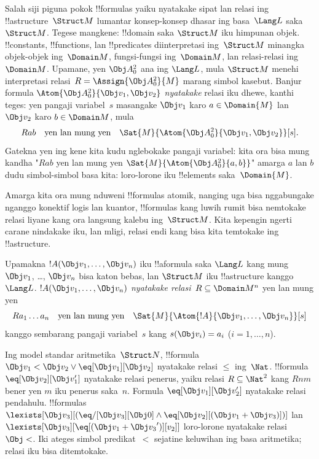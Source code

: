 \documentclass[../../../include/open-logic-section]{subfiles}
\begin{document}


\begin{explain}
Salah siji piguna pokok !!{formula}s yaiku nyatakake sipat
lan relasi ing !!a{structure}~$\Struct M$ lumantar konsep-konsep
dhasar ing basa~$\Lang L$ saka~$\Struct M$. Tegese mangkene:
!!{domain} saka $\Struct M$ iku himpunan objek.
!!{constant}s, !!{function}s, lan !!{predicate}s
diinterpretasi ing~$\Struct M$ minangka objek-objek
ing~$\Domain M$, fungsi-fungsi ing~$\Domain M$,
lan relasi-relasi ing~$\Domain M$. Upamane, yen
$\Obj A^2_0$ ana ing $\Lang L$, mula $\Struct M$
menehi interpretasi relasi~$R = \Assign{{\Obj
  A^2_0}}{M}$ marang simbol kasebut. Banjur formula
$\Atom{\Obj A^2_0}{\Obj v_1, \Obj v_2}$
\emph{nyatakake} relasi iku dhewe, kanthi teges:
yen pangaji variabel~$s$ masangake $\Obj v_1$
karo $a \in \Domain{M}$ lan $\Obj v_2$
karo $b \in \Domain M$, mula
\[
Rab \text{\quad yen lan mung yen\quad} \Sat{M}{\Atom{\Obj A^2_0}{\Obj v_1, \Obj v_2}}[s].
\]
Gatekna yen ing kene kita kudu nglebokake pangaji
variabel: kita ora bisa mung kandha
"$Rab$ yen lan mung yen $\Sat{M}{\Atom{\Obj A^2_0}{a, b}}$"
amarga $a$ lan $b$ dudu simbol-simbol basa kita:
loro-lorone iku !!{element}s saka~$\Domain{M}$.

Amarga kita ora mung nduweni !!{formula}s atomik,
nanging uga bisa nggabungake nganggo konektif
logis lan kuantor, !!{formula}s kang luwih rumit
bisa nemtokake relasi liyane kang ora langsung
kalebu ing~$\Struct M$. Kita kepengin ngerti
carane nindakake iku, lan mligi, relasi endi
kang bisa kita temtokake ing !!a{structure}.
\end{explain}

\begin{defn}
Upamakna $!A(\Obj v_1,\dots, \Obj v_n)$ iku
!!a{formula} saka $\Lang L$ kang mung $\Obj v_1$,
\dots, $\Obj v_n$ bisa katon bebas, lan
$\Struct M$ iku !!a{structure} kanggo~$\Lang L$.
$!A(\Obj v_1,\dots, \Obj v_n)$
\emph{nyatakake relasi}~$R \subseteq \Domain M^n$
yen lan mung yen
\[
Ra_1\dots a_n \text{\quad yen lan mung yen\quad} \Sat{M}{\Atom{!A}{\Obj
    v_1,\dots, \Obj v_n}}[s]
\]
kanggo sembarang pangaji variabel~$s$ kang
$s(\Obj v_i) = a_i$ ($i = 1, \dots, n$).
\end{defn}

\begin{ex}
Ing model standar aritmetika~$\Struct N$, !!{formula} $\Obj
v_1 < \Obj v_2 \lor \eq[\Obj v_1][\Obj v_2]$
nyatakake relasi $\le$ ing~$\Nat$.
!!{formula} $\eq[\Obj v_2][\Obj v_1']$
nyatakake relasi penerus, yaiku relasi $R \subseteq
\Nat^2$ kang $Rnm$ bener yen $m$ iku penerus saka~$n$.
Formula $\eq[\Obj v_1][\Obj v_2']$
nyatakake relasi pendahulu. !!{formula}s
$\lexists[\Obj v_3][(\eq/[\Obj v_3][\Obj 0] \land
  \eq[\Obj v_2][(\Obj v_1 + \Obj v_3)])]$ lan
$\lexists[\Obj
  v_3][\eq[(\Obj v_1 + {\Obj v_3}')][v_2]]$
loro-lorone nyatakake relasi $\Obj <$.
Iki ateges simbol predikat~$<$ sejatine
keluwihan ing basa aritmetika; relasi iku
bisa ditemtokake.
\end{ex}
\end{document}
